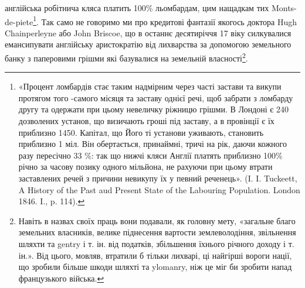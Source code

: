 \parcont{}  %
англійська робітнича кляса платить 100\% льомбардам, цим нащадкам тих Monts-de-piete\footnote{
«Процент ломбардів стає таким надмірним через часті застави та викупи протягом того
-самого місяця та заставу однієї речі, щоб забрати з ломбарду другу та одержати при цьому невеличку
ріжницю грішми. В Лондоні є 240 дозволених установ, що визичають гроші під заставу, а в провінції
є їх приблизно 1450. Капітал, що Його ті установи уживають, становить приблизно 1 міл. Він
обертається,
принаймні, тричі на рік, даючи кожного разу пересічно 33 \%: так що нижчі кляси
Англії платять приблизно 100\% річно за часову позику одного мільйона, не рахуючи при цьому втрати
заставлених речей з причини невикупу їх у певний реченець». (I. I. Tuckeett, A History of the Past
aud Present State of the Labouring Population. London 1846. I., p. 114).
}.
Так само не говоримо ми про кредитові фантазії якогось доктора
Hugh Chainperleyne або John Briscoe, що в останнє десятиріччя 17 віку силкувалися
емансипувати англійську аристократію від лихварства за допомогою
земельного банку з паперовими грішми які базувалися на земельній власності\footnote{
Навіть в назвах своїх праць вони подавали, як головну мету, «загальне благо земельних
власників, велике піднесення вартости землеволодіння, звільнення шляхти та gentry і т. ін. від
податків,
збільшення їхнього річного доходу і т. ін.». Від цього, мовляв, втратили б тільки лихварі, ці
найгірші
вороги нації, що зробили більше шкоди шляхті та ylomanry, ніж це міг би зробити напад французького
війська.
}.

